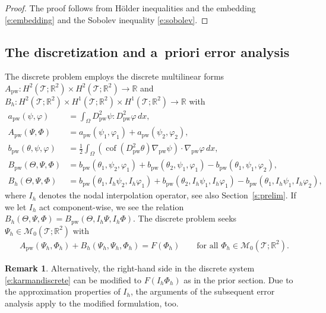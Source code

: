\documentclass[a4paper]{amsart}
\theoremstyle{definition}
\newtheorem{remark}[theorem]{Remark}
\numberwithin{equation}{section}
\numberwithin{theorem}{section}
\newcommand{\R}{\mathbb{R}}
\newcommand{\pw}{\mathrm{pw}}
\newcommand{\tri}{\mathcal{T}}
\newcommand{\cof}{\operatorname{cof}}
\begin{document}
\begin{proof}
    The proof follows from H\"older inequalities and the 
    embedding \eqref{e:embedding} and the Sobolev inequality \eqref{e:sobolev}.
\end{proof}





\subsection{The discretization and a~priori error analysis} \label{ss:vK_discrete}

The discrete problem employs the discrete multilinear forms 
$A_\pw:H^2(\tri;\R^2)\times H^2(\tri;\R^2)\to\R$ and
$B_h:H^2(\tri;\R^2)\times H^1(\tri;\R^2)\times H^1(\tri;\R^2)\to\R$
with 
\begin{align*}
    a_\pw(\psi,\varphi) &= \int_\Omega D_\pw^2 \psi:D_\pw^2\varphi\,dx,\\
    A_\pw(\Psi,\Phi) &= a_\pw(\psi_1,\varphi_1) + a_\pw(\psi_2,\varphi_2) ,\\
    b_\pw(\theta,\psi,\varphi) 
       &= \frac{1}{2}\int_\Omega
            (\cof(D_\pw^2\theta)\nabla_\pw \psi)\cdot\nabla_\pw \varphi\,dx,\\
    B_\pw(\Theta,\Psi,\Phi) &= b_\pw(\theta_1,\psi_2,\varphi_1) 
        + b_\pw(\theta_2,\psi_1,\varphi_1)
        - b_\pw(\theta_1,\psi_1,\varphi_2),\\    
    B_h(\Theta,\Psi,\Phi) &= b_\pw(\theta_1,I_h\psi_2,I_h\varphi_1) 
        + b_\pw(\theta_2,I_h\psi_1,I_h\varphi_1)
        - b_\pw(\theta_1,I_h\psi_1,I_h\varphi_2),
\end{align*}
where $I_h$ denotes the nodal interpolation operator, see also 
Section~\ref{s:prelim}.
If we let $I_h$ act component-wise, we see the relation 
$B_h(\Theta,\Psi,\Phi)=B_\pw(\Theta,I_h\Psi,I_h\Phi)$.
The discrete problem seeks $\Psi_h\in \mathcal{M}_0(\tri;\R^2)$ with 
\begin{align}\label{e:karmandiscrete}
    A_\pw(\Psi_h,\Phi_h) + B_h(\Psi_h,\Psi_h,\Phi_h) = F(\Phi_h)
    \qquad \text{for all }\Phi_h\in \mathcal{M}_0(\tri;\R^2).
\end{align}

\begin{remark}
Alternatively, the right-hand side in the discrete system
\eqref{e:karmandiscrete} can be modified to $F(I_h\Phi_h)$
as in the prior section. Due to the approximation properties
of $I_h$, the arguments of the subsequent error analysis
apply to the modified formulation, too.
\end{remark}
\end{document}
